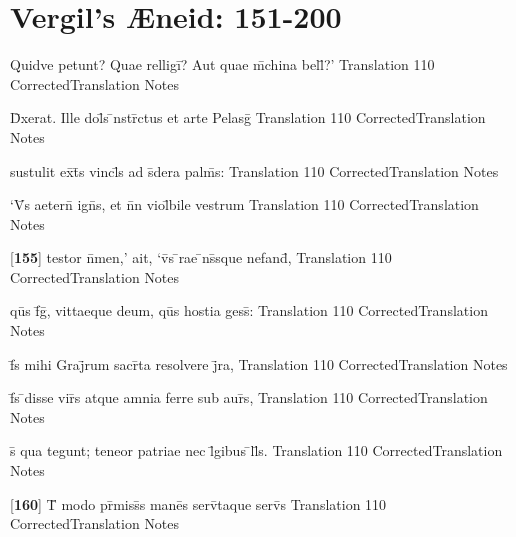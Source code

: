 \section{Vergil's {\AE}neid: 151-200} %

\latline
  {Quidve petunt?  Quae relligi\={}?  Aut quae m\={}china bell\={\macron {\i}}?'}
  { Translation }
  {110}
  { CorrectedTranslation }
  { Notes }


\latline
  {D\={\macron {\i}}xerat.  Ille dol\={\macron {\i}}s \={\macron {\i}}nstr\={}ctus et arte Pelasg\={}}
  { Translation }
  {110}
  { CorrectedTranslation }
  { Notes }


\latline
  {sustulit ex\={}t\={}s vincl\={\macron {\i}}s ad s\={\macron {\i}}dera palm\={}s:}
  { Translation }
  {110}
  { CorrectedTranslation }
  { Notes }


\latline
  {`V\={}s aetern\={\macron {\i}} ign\={}s, et n\={}n viol\={}bile vestrum}
  { Translation }
  {110}
  { CorrectedTranslation }
  { Notes }


\latline
  {[\textbf{155}] testor n\={}men,' ait, `v\={}s \={}rae \={}ns\={}sque nefand\={\macron {\i}},}
  { Translation }
  {110}
  { CorrectedTranslation }
  { Notes }


\latline
  {qu\={}s f\={}g\={\macron {\i}}, vittaeque deum, qu\={}s hostia gess\={\macron {\i}}:}
  { Translation }
  {110}
  { CorrectedTranslation }
  { Notes }


\latline
  {f\={}s mihi Graj\={}rum sacr\={}ta resolvere j\={}ra,}
  { Translation }
  {110}
  { CorrectedTranslation }
  { Notes }


\latline
  {f\={}s \={}disse vir\={}s atque amnia ferre sub aur\={}s,}
  { Translation }
  {110}
  { CorrectedTranslation }
  { Notes }


\latline
  {s\={\macron {\i}} qua tegunt; teneor patriae nec l\={}gibus \={}ll\={\macron {\i}}s.  }
  { Translation }
  {110}
  { CorrectedTranslation }
  { Notes }


\latline
  {[\textbf{160}] T\={} modo pr\={}miss\={\macron {\i}}s mane\={}s serv\={}taque serv\={}s}
  { Translation }
  {110}
  { CorrectedTranslation }
  { Notes }


